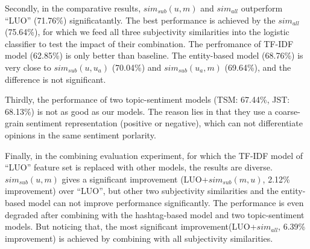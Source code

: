 \documentclass{acm_proc_article-sp}
\begin{document}
Secondly, in the comparative results, $ sim_{sub} \left( u,m \right) $ and $ sim_{all}  $ outperform ``LUO'' (71.76\%) significatantly.
The best performance is achieved by the $ sim_{all}  $ (75.64\%), for which we feed all three subjectivity similarities into the logistic classifier to test the impact of their combination. 
The perfromance of TF-IDF model (62.85\%) is only better than baseline. 
The entity-based model (68.76\%) is very close to  $ sim_{sub}\left( u,u_{a} \right)$ (70.04\%) and $ sim_{sub}\left( u_{a},m \right)  $ (69.64\%), and the difference is not significant.

Thirdly, the performance of two topic-sentiment models (TSM: 67.44\%, JST: 68.13\%) is not as good as our models. The reason lies in that they use a coarse-grain sentiment representation (positive or negative), which can not differentiate opinions in the same sentiment porlarity.

Finally, in the combining evaluation experiment, for which the TF-IDF model of ``LUO'' feature set is replaced with other models, the results are diverse. $ sim_{sub} \left( u,m \right) $ gives a significant improvement (LUO+$ sim_{sub} \left( m,u \right) $, 2.12\% improvement) over ``LUO'', but other two subjectivity similarities and the entity-based model can not improve performance significantly. The performance is even degraded after combining with the hashtag-based model and two topic-sentiment models. 
But noticing that, the most significant improvement(LUO+$ sim_{all}  $, 6.39\% improvement) is achieved by combining with all subjectivity similarities. 
\end{document}
